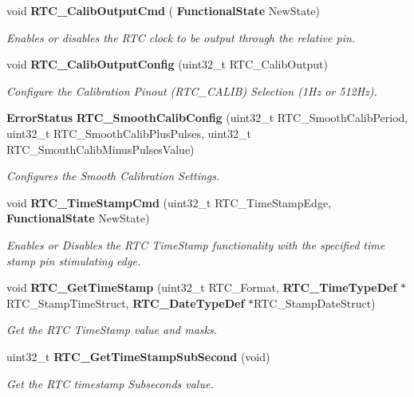 \begin{DoxyCompactItemize}
void \textbf{ R\+T\+C\+\_\+\+Calib\+Output\+Cmd} (\textbf{ Functional\+State} New\+State)
\begin{DoxyCompactList}\small\item\em Enables or disables the R\+TC clock to be output through the relative pin. \end{DoxyCompactList}\item 
void \textbf{ R\+T\+C\+\_\+\+Calib\+Output\+Config} (uint32\+\_\+t R\+T\+C\+\_\+\+Calib\+Output)
\begin{DoxyCompactList}\small\item\em Configure the Calibration Pinout (R\+T\+C\+\_\+\+C\+A\+L\+IB) Selection (1\+Hz or 512\+Hz). \end{DoxyCompactList}\item 
\textbf{ Error\+Status} \textbf{ R\+T\+C\+\_\+\+Smooth\+Calib\+Config} (uint32\+\_\+t R\+T\+C\+\_\+\+Smooth\+Calib\+Period, uint32\+\_\+t R\+T\+C\+\_\+\+Smooth\+Calib\+Plus\+Pulses, uint32\+\_\+t R\+T\+C\+\_\+\+Smouth\+Calib\+Minus\+Pulses\+Value)
\begin{DoxyCompactList}\small\item\em Configures the Smooth Calibration Settings. \end{DoxyCompactList}\item 
void \textbf{ R\+T\+C\+\_\+\+Time\+Stamp\+Cmd} (uint32\+\_\+t R\+T\+C\+\_\+\+Time\+Stamp\+Edge, \textbf{ Functional\+State} New\+State)
\begin{DoxyCompactList}\small\item\em Enables or Disables the R\+TC Time\+Stamp functionality with the specified time stamp pin stimulating edge. \end{DoxyCompactList}\item 
void \textbf{ R\+T\+C\+\_\+\+Get\+Time\+Stamp} (uint32\+\_\+t R\+T\+C\+\_\+\+Format, \textbf{ R\+T\+C\+\_\+\+Time\+Type\+Def} $\ast$R\+T\+C\+\_\+\+Stamp\+Time\+Struct, \textbf{ R\+T\+C\+\_\+\+Date\+Type\+Def} $\ast$R\+T\+C\+\_\+\+Stamp\+Date\+Struct)
\begin{DoxyCompactList}\small\item\em Get the R\+TC Time\+Stamp value and masks. \end{DoxyCompactList}\item 
uint32\+\_\+t \textbf{ R\+T\+C\+\_\+\+Get\+Time\+Stamp\+Sub\+Second} (void)
\begin{DoxyCompactList}\small\item\em Get the R\+TC timestamp Subseconds value. \end{DoxyCompactList}\item 

\end{DoxyCompactItemize}
